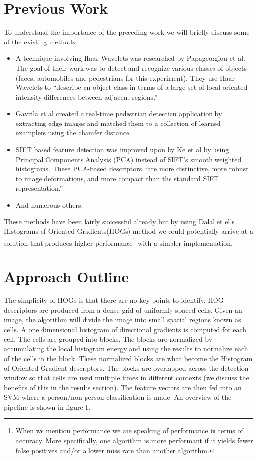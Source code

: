 \documentclass[a4paper,11pt]{article}
\begin{document}
\begin{multicols}{2}
\section{Previous Work}
To understand the importance of the preceding work we will briefly discuss some of the existing methods:
\begin{itemize}
  \item A technique involving Haar Wavelets was researched by Papageorgiou et al\cite{Papa00}. 
    The goal of their work was to detect and recognize various classes of objects (faces, automobiles and 
    pedestrians for this experiment). They use Haar Wavelets to “describe an object class in terms of a 
    large set of local oriented intensity differences between adjacent regions.”
  \item Gavrila et al\cite{Garvri04} created a real-time pedestrian detection application by extracting edge images and 
    matched them to a collection of learned examplers using the chamfer distance.
  \item SIFT based feature detection was improved upon by Ke et al\cite{Ke04} by using Principal Components Analysis 
    (PCA) instead of SIFT’s smooth weighted histograms. These PCA-based descriptors “are more distinctive, 
    more robust to image deformations, and more compact than the standard SIFT representation.”
  \item And numerous others.
\end{itemize}
These methods have been fairly successful already but by using Dalal et el's Histograms of Oriented Gradients(HOGs) method
we could potentially arrive at a solution that produces higher performance\footnote
{When we mention performance we are speaking of performance in terms of accuracy. More specifically, one algorithm 
is more performant if it yields fewer false positives and/or a lower miss rate than another algorithm.} 
with a simpler implementation.


\section{Approach Outline}
The simplicity of HOGs is that there are no key-points to identify. HOG descriptors are produced from a dense grid 
of uniformly spaced cells. Given an image, the algorithm will divide the image into small spatial regions known as 
cells. A one dimensional histogram of directional gradients is computed for each cell. The cells are grouped into 
blocks. The blocks are normalized by accumulating the local histogram energy and using the results to normalize each 
of the cells in the block. These normalized blocks are what become the Histogram of Oriented Gradient descriptors.
The blocks are overlapped across the detection window so that cells are used multiple times in different 
contexts (we discuss the benefits of this in the results section). The feature vectors are then fed into an 
SVM where a person/non-person classification is made. An overview of the pipeline is shown in figure 1. 


\end{multicols}
\end{document}

